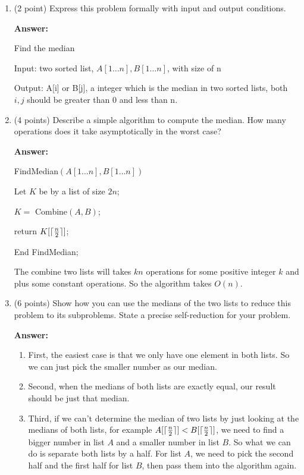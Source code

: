\documentclass[paper=a4, fontsize=11pt]{scrartcl}
\DeclarePairedDelimiter\ceil{\lceil}{\rceil}
\newcommand\tab[1][0.6cm]{\hspace*{#1}}
\numberwithin{equation}{section}		%
\numberwithin{figure}{section}			%
\numberwithin{table}{section}				%
\begin{document}
\begin{enumerate}
\item (2 point) Express this problem formally with input and output conditions.

\textbf{Answer:}

Find the median

Input: two sorted list, $A[1\dots n], B[1\dots n]$, with size of n

Output: A[i] or B[j], a integer which is the median in two sorted lists, both $i,j$ should be greater than 0 and less than n.



\item (4 points) Describe a simple algorithm to compute the median.  How many operations does it take asymptotically in the worst case?

\textbf{Answer:}

FindMedian$(A[1\dots n], B[1\dots n])$

\tab Let $K$ be by a list of size $2n$;

\tab $K = $ Combine$(A,B)$;

\tab return $K[\ceil{\frac{n}{2}}]$;

End FindMedian;

The combine two lists will takes $kn$ operations for some positive integer $k$ and plus some constant operations. So the algorithm takes $O(n)$.


\item (6 points) Show how you can use the medians of the two lists to reduce this problem to its subproblems.  State a precise self-reduction for your problem.

\textbf{Answer:}

\begin{enumerate}
	\item First, the easiest case is that we only have one element in both lists. So we can just pick the smaller number as our median.
	
	\item Second, when the medians of both lists are exactly equal, our result should be just that median.
	
	\item Third, if we can't determine the median of two lists by just looking at the medians of both lists, for example $A[\ceil{\frac{n}{2}}] < B[\ceil{\frac{n}{2}}]$, we need to find a bigger number in list $A$ and a smaller number in list $B$. So what we can do is separate both lists by a half. For list $A$, we need to pick the second half and the first half for list $B$, then pass them into the algorithm again.
	

\end{enumerate}
\end{enumerate}
\end{document}
